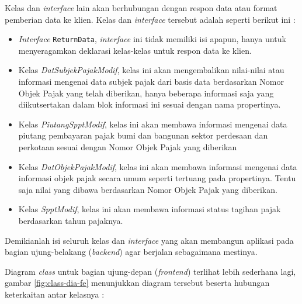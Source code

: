 \documentclass[pdftex,12pt, oneside]{article}
\begin{document}
Kelas dan \textit{interface} lain akan berhubungan dengan respon data atau format pemberian data ke klien. Kelas dan \textit{interface} tersebut adalah seperti berikut ini :

\begin{itemize}
	\item \textit{Interface} \texttt{ReturnData}, \textit{interface} ini tidak memiliki isi apapun, hanya untuk menyeragamkan deklarasi kelas-kelas untuk respon data ke klien.
	\item Kelas \textit{DatSubjekPajakModif}, kelas ini akan mengembalikan nilai-nilai atau informasi mengenai data subjek pajak dari basis data berdasarkan Nomor Objek Pajak yang telah diberikan, hanya beberapa informasi saja yang diikutsertakan dalam blok informasi ini sesuai dengan nama propertinya.
	\item Kelas \textit{PiutangSpptModif}, kelas ini akan membawa informasi mengenai data piutang pembayaran pajak bumi dan bangunan sektor perdesaan dan perkotaan sesuai dengan Nomor Objek Pajak yang diberikan
	\item Kelas \textit{DatObjekPajakModif}, kelas ini akan membawa informasi mengenai data informasi objek pajak secara umum seperti tertuang pada propertinya. Tentu saja nilai yang dibawa berdasarkan Nomor Objek Pajak yang diberikan.
	\item Kelas \textit{SpptModif}, kelas ini akan membawa informasi status tagihan pajak berdasarkan tahun pajaknya.
\end{itemize}

Demikianlah isi seluruh kelas dan \textit{interface} yang akan membangun aplikasi pada bagian ujung-belakang (\textit{backend}) agar berjalan sebagaimana mestinya.

Diagram \textit{class} untuk bagian ujung-depan (\textit{frontend}) terlihat lebih sederhana lagi, gambar \ref{fig:class-dia-fe} menunjukkan diagram tersebut beserta hubungan keterkaitan antar kelasnya :
\end{document}
